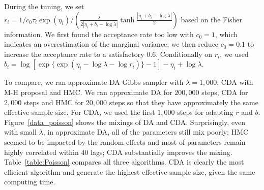 \documentclass[10pt]{article}
\begin{document}
During the tuning, we set $r_i = 1/c_0 \tau_i\exp(\eta_i) /  \left( \frac{\lambda } {2|\eta_i + b_i - \log\lambda|}  \tanh\frac{ |\eta_i + b_i - \log\lambda|}{2} \right )$ based on the Fisher information. We first found the acceptance rate too low with $c_0 =1$, which indicates an overestimation of the marginal variance; we then reduce $c_0=0.1$ to increase the acceptance rate to a satisfactory $0.6$. Conditionally on $r_i$, we used $b_i=\log[ \exp \{ \exp(\eta_i - \log\lambda -\log r_i)   \}-1] -\eta_i + \log\lambda$.


To compare, we ran approximate DA Gibbs sampler with $\lambda=1,000$, CDA with M-H proposal and HMC. We ran approximate DA for $200,000$ steps, CDA for $2,000$ steps and HMC for $20,000$ steps so that they have approximately the same effective sample size. For CDA, we used the first $1,000$ steps for adapting $r$ and $b$. Figure~\ref{data_poisson} shows the mixings of DA and CDA. Surprisingly, even with small $\lambda$, in approximate DA, all of the parameters still mix poorly; HMC seemed to be impacted by the random effects and most of parameters remain highly correlated within $40$ lags; CDA substantially improves the mixing. Table~\ref{table:Poisson} compares all three algorithms. CDA is clearly the most efficient algorithm and generate the highest effective sample size, given the same computing time.
\end{document}
